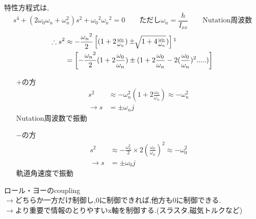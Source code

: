 \documentclass[class=article, crop=false, dvipdfmx]{standalone}
\begin{document}
\begin{enumerate}[label=(\theenumi)]
特性方程式は,
\begin{equation}
s^4+(2\omega_0 \omega_n+\omega_n^2)s^2+{\omega_0}^2{\omega_n}^2=0\qquad
\text{ただし}\omega_n=\frac{h}{I_{xx}}\qquad\mathrm{Nutation 周波数}
\end{equation}
\begin{align}
\therefore s^2&
\approx
-\frac{{\omega_n}^2}{2}
\begin{bmatrix}
(1+2\frac{\omega_0}{\omega_n})
\pm\sqrt[]{1+4\frac{\omega_0}{\omega_n}})
\end{bmatrix}\footnotemark
\\
&=\qty[
-\frac{{\omega_n}^2}{2}
(1+2\frac{\omega_0}{\omega_n})\pm
(1+2\frac{\omega_0}{\omega_n}-2(\frac{\omega_0}{\omega_n})^2.....)
]
\end{align}
\begin{enumerate}
\item [$+$の方]
\begin{align}
s^2&\approx-\omega^2_n(1+2\frac{\omega_0}{\omega_n})\approx-\omega^2_n\\
\rightarrow s&=\pm\omega_n j
\end{align}
Nutation周波数で振動
\item [$-$の方]
\begin{align}
s^2&\approx
-\frac{\omega^2_n}{2}\times 2(\frac{\omega_0}{\omega_n})^2
\approx-\omega^2_0\\
\rightarrow s&=\pm\omega_0 j
\end{align}
軌道角速度で振動
\end{enumerate}
ロール・ヨーのcoupling\\
$\rightarrow$どちらか一方だけ制御し,0に制御できれば,他方も0に制御できる.\\
$\rightarrow$より重要で情報のとりやすいx軸を制御する.(スラスタ,磁気トルクなど)
\end{enumerate}
\end{document}
